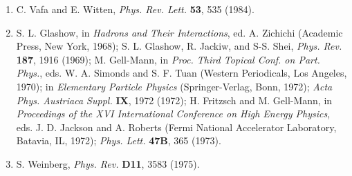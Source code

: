 \begin{enumerate}
\item {}\label{ch19-ref-50}
C. Vafa and E. Witten, \emph{Phys. Rev. Lett.} \textbf{53}, 535 (1984).

\item {}\label{ch19-ref-51}
S. L. Glashow, in \emph{Hadrons and Their Interactions}, ed. A. Zichichi (Academic Press, New York, 1968); S. L. Glashow, R. Jackiw, and S-S. Shei, \emph{Phys. Rev.} \textbf{187}, 1916 (1969); M. Gell-Mann, in \emph{Proc. Third Topical Conf. on Part. Phys.}, eds. W. A. Simonds and S. F. Tuan (Western Periodicals, Los Angeles, 1970); in \emph{Elementary Particle Physics} (Springer-Verlag, Bonn, 1972); \emph{Acta Phys. Austriaca Suppl.} \textbf{IX}, 1972 (1972); H. Fritzsch and M. Gell-Mann, in \emph{Proceedings of the XVI International Conference on High Energy Physics}, eds. J. D. Jackson and A. Roberts (Fermi National Accelerator Laboratory, Batavia, IL, 1972); \emph{Phys. Lett.} \textbf{47B}, 365 (1973).

\item {}\label{ch19-ref-52}
S. Weinberg, \emph{Phys. Rev.} \textbf{D11}, 3583 (1975).
\end{enumerate}
